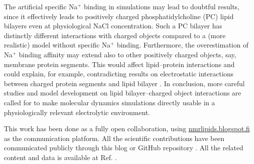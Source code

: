 \documentclass[twoside,twocolumn,9pt]{article}
\begin{document}
The artificial specific Na$^+$ binding in simulations may lead to doubtful results, since it effectively leads  to
positively charged phosphatidylcholine (PC) lipid bilayers even at physiological NaCl concentration.
Such a PC bilayer has distinctly different interactions with charged objects compared to a (more realistic)
model without specific Na$^+$ binding. Furthermore, the overestimation of Na$^+$ binding affinity may
extend also to other positively charged objects, say, membrane protein segments. This would affect
lipid--protein interactions and could explain, for example, contradicting results on electrostatic interactions 
between charged protein segments and lipid bilayer \cite{arkhipov13,kaszuba15}. In conclusion, 
more careful studies and model development on lipid bilayer--charged object interactions are
called for to make molecular dynamics simulations directly usable in a physiologically relevant
electrolytic environment. 


This work has been done as a fully open collaboration, using
\url{nmrlipids.blogspot.fi} as the communication platform. All the
scientific contributions have been communicated publicly through
this blog or GitHub repository \cite{githubIONpaper}.%
All the related content and data is available at Ref. . %

\end{document}
